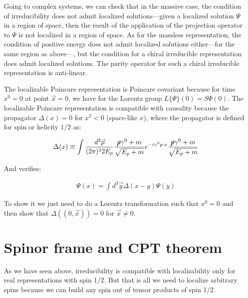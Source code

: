 \documentclass[11pt]{book}
\begin{document}
Going to complex systems, we can check that in the massive case, the
condition of irreducibility does not admit localized solutions---given a
localized solution \(\Psi\) in a region of space, then the result of the
application of the projection operator to \(\Psi\) is not localized in a
region of space. As for the massless representation, the condition of
positive energy does not admit localized solutions either---for the same
region as above---, but the condition for a chiral irreducible
representation does admit localized solutions. The parity operator for
such a chiral irreducible representation is anti-linear.

The localizable Poincare representation is Poincare covariant because
for time \(x^0=0\) at point \(\vec{x}=0\), we have for the Lorentz group
\(L\{\Psi\}(0)=S\Psi(0)\). The localizable Poincare representation is
compatible with causality because the propagator \(\Delta(x)=0\) for
\(x^2<0\) (space-like \(x\)), where the propagator is defined for spin
or helicity \(1/2\) as:

\begin{equation}\begin{aligned}
\Delta(x)\equiv \int \frac{d^3\vec{p}}{(2\pi)^32E_p}
\frac{\cancel p\gamma^0+m}{\sqrt{E_p+m}}e^{-i\gamma^0 p\cdot x}
\frac{\cancel p\gamma^0+m}{\sqrt{E_p+m}}\end{aligned}\end{equation}

And verifies:

\begin{equation}\begin{aligned}
\Psi(x)=\int d^3\vec{y} \Delta(x-y)\Psi(y)\end{aligned}\end{equation}

To show it we just need to do a Lorentz transformation such that
\(x^0=0\) and then show that \(\Delta((0,\vec{x}))=0\) for
\(\vec{x}\neq 0\).

\hypertarget{spinor-frame-and-cpt-theorem}{%
\section{Spinor frame and CPT
theorem}\label{spinor-frame-and-cpt-theorem}}

As we have seen above, irreducibility is compatible with localizability
only for real representations with spin 1/2. But that is all we need to
localize arbitrary spins because we can build any spin out of tensor
products of spin 1/2.
\end{document}
